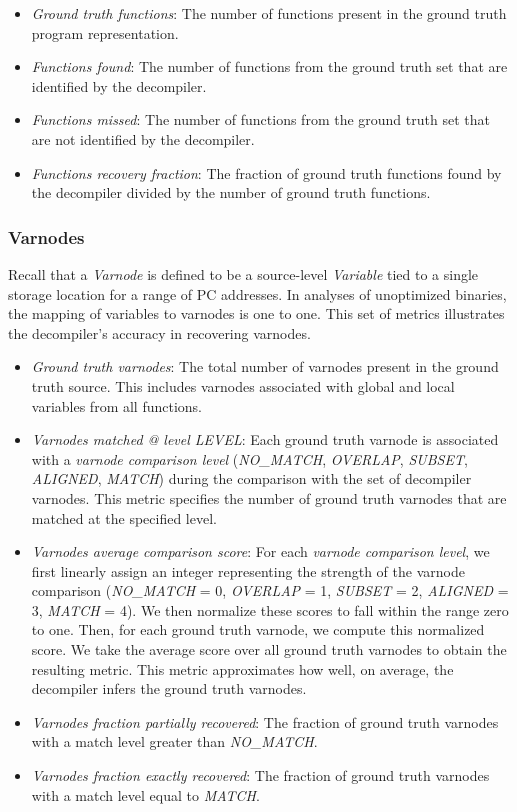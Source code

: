 \documentclass[conference]{IEEEtran}
\begin{document}
\begin{itemize}
    \item \emph{Ground truth functions}: The number of functions present in the ground truth program representation.
    \item \emph{Functions found}: The number of functions from the ground truth set that are identified by the decompiler.
    \item \emph{Functions missed}: The number of functions from the ground truth set that are not identified by the decompiler.
    \item \emph{Functions recovery fraction}: The fraction of ground truth functions found by the decompiler divided by the number of ground truth functions.
\end{itemize}

\subsubsection{Varnodes}

Recall that a \emph{Varnode} is defined to be a source-level \emph{Variable} tied to a single storage location for a range of PC addresses. In analyses of unoptimized binaries, the mapping of variables to varnodes is one to one. This set of metrics illustrates the decompiler's accuracy in recovering varnodes.

\begin{itemize}
    \item \emph{Ground truth varnodes}: The total number of varnodes present in the ground truth source. This includes varnodes associated with global and local variables from all functions.
    \item \emph{Varnodes matched @ level LEVEL}: Each ground truth varnode is associated with a \emph{varnode comparison level} (\emph{NO\_MATCH}, \emph{OVERLAP}, \emph{SUBSET}, \emph{ALIGNED}, \emph{MATCH}) during the comparison with the set of decompiler varnodes. This metric specifies the number of ground truth varnodes that are matched at the specified level.
    \item \emph{Varnodes average comparison score}: For each \emph{varnode comparison level}, we first linearly assign an integer representing the strength of the varnode comparison (\emph{NO\_MATCH} = 0, \emph{OVERLAP} = 1, \emph{SUBSET} = 2, \emph{ALIGNED} = 3, \emph{MATCH} = 4). We then normalize these scores to fall within the range zero to one. Then, for each ground truth varnode, we compute this normalized score. We take the average score over all ground truth varnodes to obtain the resulting metric. This metric approximates how well, on average, the decompiler infers the ground truth varnodes.
    \item \emph{Varnodes fraction partially recovered}: The fraction of ground truth varnodes with a match level greater than \emph{NO\_MATCH}.
    \item \emph{Varnodes fraction exactly recovered}: The fraction of ground truth varnodes with a match level equal to \emph{MATCH}.
\end{itemize}
\end{document}
